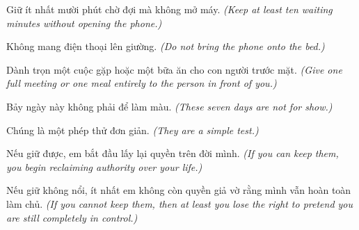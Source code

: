 \begin{tcolorbox}[colback=white,colframe=bookprimary!60,arc=4pt,boxrule=0.8pt,title={Ngày 5. Khoảng Trống},fonttitle=\bfseries]
Giữ ít nhất mười phút chờ đợi mà không mở máy.
\textit{(Keep at least ten waiting minutes without opening the phone.)}
\end{tcolorbox}

\begin{tcolorbox}[colback=white,colframe=bookprimary!60,arc=4pt,boxrule=0.8pt,title={Ngày 6. Giấc Ngủ},fonttitle=\bfseries]
Không mang điện thoại lên giường.
\textit{(Do not bring the phone onto the bed.)}
\end{tcolorbox}

\begin{tcolorbox}[colback=white,colframe=bookprimary!60,arc=4pt,boxrule=0.8pt,title={Ngày 7. Người Khác},fonttitle=\bfseries]
Dành trọn một cuộc gặp hoặc một bữa ăn cho con người trước mặt.
\textit{(Give one full meeting or one meal entirely to the person in front of you.)}
\end{tcolorbox}

\begin{baihoc}
Bảy ngày này không phải để làm màu.
\textit{(These seven days are not for show.)}

Chúng là một phép thử đơn giản.
\textit{(They are a simple test.)}

Nếu giữ được, em bắt đầu lấy lại quyền trên đời mình.
\textit{(If you can keep them, you begin reclaiming authority over your life.)}

Nếu giữ không nổi, ít nhất em không còn quyền giả vờ rằng mình vẫn hoàn toàn làm chủ.
\textit{(If you cannot keep them, then at least you lose the right to pretend you are still completely in control.)}
\end{baihoc}

\ngancach